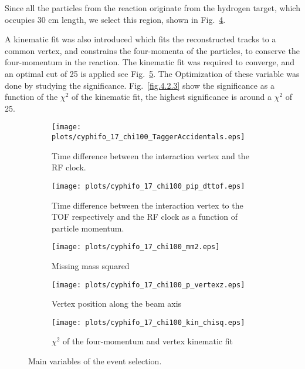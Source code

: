 Since all the particles from the reaction originate from the hydrogen target, which occupies 30 cm length, we select this region, shown in Fig.~\ref{fig.4.2.1.d}.
\par A kinematic fit was also introduced which fits the reconstructed tracks to a common vertex, and constrains the four-momenta of the particles, to conserve the four-momentum in the reaction. The kinematic fit was required to converge, and an optimal cut of 25 is applied see Fig.~\ref{fig.4.2.1.e}. The Optimization of these variable was done by studying the significance. Fig.~\ref{fig.4.2.3} show the significance as a function of the $\chi^2$ of the kinematic fit, the highest significance is around a $\chi^2$ of 25.

\begin{figure}[H]
    \centering
    \begin{subfigure}[b]{0.45\textwidth}
        \texttt{[image: plots/cyphifo\_17\_chi100\_TaggerAccidentals.eps]}
        \caption{Time difference between the interaction vertex and the RF clock.}
        \label{fig.4.2.1.a}
    \end{subfigure}\hfill
    \begin{subfigure}[b]{0.45\textwidth}
        \texttt{[image: plots/cyphifo\_17\_chi100\_pip\_dttof.eps]}
        \caption{Time difference between the interaction vertex to the TOF respectively and the RF clock as a function of particle momentum.}
        \label{fig.4.2.1.b}
    \end{subfigure}\hfill
    \begin{subfigure}[b]{0.45\textwidth}
        \texttt{[image: plots/cyphifo\_17\_chi100\_mm2.eps]}
        \caption{Missing mass squared}
        \label{fig.4.2.1.c}
    \end{subfigure}\hfill
    \begin{subfigure}[b]{0.45\textwidth}
        \texttt{[image: plots/cyphifo\_17\_chi100\_p\_vertexz.eps]}
        \caption{Vertex position along the beam axis}
        \label{fig.4.2.1.d}
    \end{subfigure}\hfill
    \begin{subfigure}[b]{0.45\textwidth}
        \texttt{[image: plots/cyphifo\_17\_chi100\_kin\_chisq.eps]}
        \caption{$\chi^{2}$ of the four-momentum and vertex kinematic fit}
        \label{fig.4.2.1.e}
    \end{subfigure}
    \caption{Main variables of the event selection.}
    \label{fig.4.2.1}
\end{figure}

